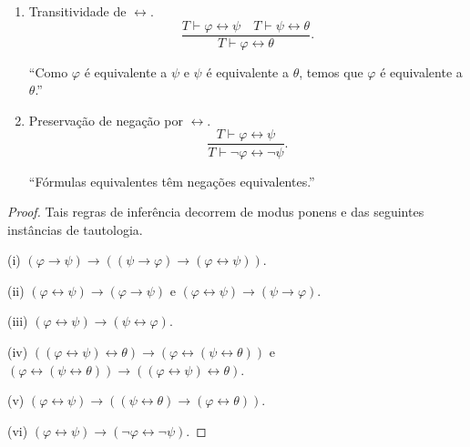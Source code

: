 \begin{metaproposition}
\begin{enumerate}[label=(\roman*)]
        \item Transitividade de $\leftrightarrow$.
        \[
            \frac{T\vdash \varphi\leftrightarrow\psi \quad T\vdash \psi\leftrightarrow\theta}
                 {T\vdash \varphi\leftrightarrow\theta}.
        \]

        ``Como $\varphi$ é equivalente a $\psi$ e $\psi$ é equivalente a $\theta$, temos que $\varphi$ é equivalente a $\theta$.''

        \item Preservação de negação por $\leftrightarrow$.
        \[
            \frac{T\vdash \varphi\leftrightarrow\psi}
                 {T\vdash \neg\varphi\leftrightarrow\neg\psi}.
        \]

        ``Fórmulas equivalentes têm negações equivalentes.''
    \end{enumerate}
\end{metaproposition}
\begin{proof}
    Tais regras de inferência decorrem de modus ponens e das seguintes instâncias de tautologia.

    (i) $(\varphi\rightarrow\psi)\rightarrow((\psi\rightarrow\varphi)\rightarrow(\varphi\leftrightarrow\psi))$.

    (ii) $(\varphi\leftrightarrow\psi)\rightarrow(\varphi\rightarrow\psi)$ e $(\varphi\leftrightarrow\psi)\rightarrow(\psi\rightarrow\varphi)$.

    (iii) $(\varphi\leftrightarrow\psi)\rightarrow(\psi\leftrightarrow\varphi)$.

    (iv) $((\varphi\leftrightarrow\psi)\leftrightarrow\theta)\rightarrow(\varphi\leftrightarrow(\psi\leftrightarrow\theta))$ e $(\varphi\leftrightarrow(\psi\leftrightarrow\theta)) \rightarrow ((\varphi\leftrightarrow \psi)\leftrightarrow \theta)$.

    (v) $(\varphi\leftrightarrow\psi)\rightarrow((\psi\leftrightarrow\theta)\rightarrow(\varphi\leftrightarrow\theta))$.

    (vi) $(\varphi\leftrightarrow\psi)\rightarrow(\neg\varphi\leftrightarrow\neg\psi)$.
\end{proof}
